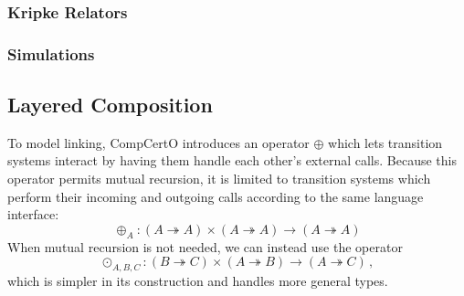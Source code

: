 \documentclass[acmsmall,screen,review,anonymous]{acmart}
\begin{document}

\subsubsection{Kripke Relators}

\subsubsection{Simulations} %

\begin{definition} \label{def:simconv}
\end{definition}

\begin{definition} \label{def:sim}
\end{definition}

\begin{definition} \label{def:ccomp}
\end{definition}

\begin{theorem} \label{thm:vcomp}
\end{theorem}



\subsection{Layered Composition} \label{sec:basic:lcomp} %

To model linking,
CompCertO introduces an operator $\oplus$
which lets transition systems interact
by having them handle each other's external calls.
Because this operator permits mutual recursion,
it is limited to transition systems which perform
their incoming and outgoing calls
according to the same language interface:
\[
  {\oplus_A} :
    (A \twoheadrightarrow A) \times
    (A \twoheadrightarrow A) \rightarrow
    (A \twoheadrightarrow A)
\]
When mutual recursion is not needed,
we can instead use the operator
\[
  {\odot_{A,B,C}} :
    (B \twoheadrightarrow C) \times
    (A \twoheadrightarrow B) \rightarrow
    (A \twoheadrightarrow C)
  \,,
\]
which is simpler in its construction
and handles more general types.
\end{document}
